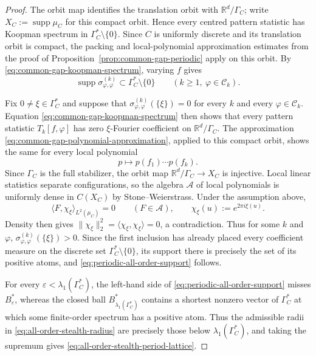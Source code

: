 \documentclass[11pt,reqno,a4paper]{amsart}
\numberwithin{equation}{section}
\theoremstyle{compact}
\theoremstyle{definition}
\theoremstyle{definition}
\begin{document}
\begin{proof}
The orbit map identifies the translation orbit with
$\mathbb R^d/\Gamma_C$; write $X_C:=\operatorname{supp}\mu_C$ for this compact orbit.  Hence every centred pattern statistic has Koopman
spectrum in $\Gamma_C^*\setminus\{0\}$.  Since $C$ is uniformly discrete and its translation orbit is compact, the
packing and local-polynomial approximation estimates from the proof of
Proposition~\ref{prop:common-gap-periodic} apply on this orbit.  By
\eqref{eq:common-gap-koopman-spectrum}, varying $f$ gives
\[
  \operatorname{supp}\sigma^{(k)}_{\varphi,\varphi}
  \subset\Gamma_C^*\setminus\{0\}
  \qquad(k\geq1,\ \varphi\in\mathcal C_k).
\]

Fix $0\neq\xi\in\Gamma_C^*$ and suppose that
$\sigma^{(k)}_{\varphi,\varphi}(\{\xi\})=0$ for every $k$ and every
$\varphi\in\mathcal C_k$.  Equation
\eqref{eq:common-gap-koopman-spectrum} then shows that every pattern statistic
$T_k[f,\varphi]$ has zero $\xi$-Fourier coefficient on
$\mathbb R^d/\Gamma_C$.  The approximation
\eqref{eq:common-gap-polynomial-approximation}, applied to this compact orbit,
shows the same for every local polynomial
\[
  p\longmapsto p(f_1)\cdots p(f_k).
\]
Since $\Gamma_C$ is the full stabilizer, the orbit map
$\mathbb R^d/\Gamma_C\to X_C$ is injective.  Local linear statistics separate
configurations, so the algebra $\mathcal A$ of local polynomials is uniformly
dense in $C(X_C)$ by Stone--Weierstrass.  Under the assumption above,
\[
  \langle F,\chi_\xi\rangle_{L^2(\mu_C)}=0
  \qquad(F\in\mathcal A),
  \qquad
  \chi_\xi(u):=e^{2\pi i\xi(u)}.
\]
Density then gives
$\|\chi_\xi\|_2^2=\langle\chi_\xi,\chi_\xi\rangle=0$, a contradiction.
Thus for some $k$ and $\varphi$,
$\sigma^{(k)}_{\varphi,\varphi}(\{\xi\})>0$.  Since the first inclusion has
already placed every coefficient measure on the discrete set
$\Gamma_C^*\setminus\{0\}$, its support there is precisely the set of its
positive atoms, and \eqref{eq:periodic-all-order-support} follows.

For every $\varepsilon<\lambda_1(\Gamma_C^*)$, the left-hand side of
\eqref{eq:periodic-all-order-support} misses $B_\varepsilon^*$, whereas the
closed ball $B_{\lambda_1(\Gamma_C^*)}^*$ contains a shortest nonzero vector
of $\Gamma_C^*$ at which some finite-order spectrum has a positive atom.
Thus the admissible radii in \eqref{eq:all-order-stealth-radius} are precisely
those below $\lambda_1(\Gamma_C^*)$, and taking the supremum gives
\eqref{eq:all-order-stealth-period-lattice}.
\end{proof}
\end{document}
